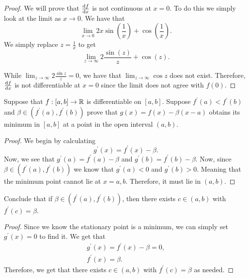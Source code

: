 \documentclass{article}
\begin{document}
    \begin{proof}
        We will prove that $\dv{f}{x}$ is not continuous at $x = 0$. To do this we simply look at the limit as $x \to 0$. We have that
        \begin{equation*}
            \lim_{x \to 0} 2x\sin(\frac{1}{x}) + \cos(\frac{1}{x}).
        \end{equation*}
        We simply replace $z = \frac{1}{x}$ to get 
        \begin{equation*}
            \lim_{z \to \infty} 2\frac{\sin(z)}{z} + \cos(z).
        \end{equation*}

        While $\lim_{z \to \infty} 2 \frac{\sin z}{z} = 0$, we have that $\lim_{z \to \infty} \cos z$ does not exist. Therefore,
        $\dv{f}{x}$ is not differentiable at $x = 0$ since the limit does not agree with $f(0)$.
    \end{proof}
    
    \newpage
    Suppose that $f: [a,b] \to \mathbb{R}$ is differentiable on $[a,b]$. Suppose $f^{\prime} (a) < f^{\prime}(b)$ and 
    $\beta \in (f^{\prime}(a), f^{\prime}(b))$ prove that $g(x) = f(x) - \beta(x - a)$ obtains its minimum in $[a,b]$ at a point in the 
    open interval $(a,b)$.

    \begin{proof}
        We begin by calculating
        \begin{equation*}
            g^{\prime}(x) = f^{\prime}(x) - \beta.
        \end{equation*}
        Now, we see that $g^{\prime}(a) = f^{\prime}(a) - \beta$ and $g^{\prime}(b) = f^{\prime}(b) - \beta$. Now, since 
        $\beta \in (f^{\prime}(a), f^{\prime}(b))$ we know that $g^{\prime}(a) < 0$ and $g^{\prime}(b) > 0$. Meaning that
        the minimum point cannot lie at $x = a,b$. Therefore, it must lie in $(a,b)$.
    \end{proof}

    Conclude that if $\beta \in (f^{\prime}(a), f^{\prime}(b))$, then there exists $c \in (a,b)$ with $f^{\prime}(c) = \beta$.

    \begin{proof}
        Since we know the stationary point is a minimum, we can simply set $g^{\prime}(x) = 0$ to find it. We get that
        \begin{gather*}
            g^{\prime}(x) = f^{\prime}(x) - \beta = 0,\\
            f^{\prime}(x) = \beta.
        \end{gather*}
        Therefore, we get that there exists $c \in (a,b)$ with $f^{\prime}(c) = \beta$ as needed.
    \end{proof}
\end{document}

